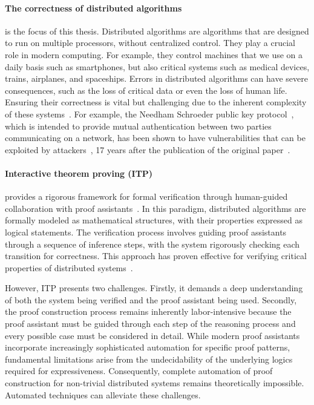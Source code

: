
\paragraph{The correctness of distributed algorithms} is the focus of this thesis. Distributed algorithms
are algorithms that are designed to run on multiple processors, without centralized control. They play a crucial role in modern computing.
For example, they control machines that we use on a daily basis such as smartphones, but also critical systems such as medical devices, trains, airplanes, and spaceships. Errors in distributed algorithms can have severe consequences, such as the loss of critical data or even the loss of human life. Ensuring their correctness is vital but challenging due to the inherent complexity of these systems~\cite{heiser2010theroad, lamport2019thebyzantine}. For example, the Needham Schroeder public key protocol~\cite{needham1978using}, which is intended to provide mutual authentication between two parties communicating on a network, has been shown to have vulnerabilities that can be exploited by attackers~\cite{lowe1996breaking}, 17 years after the publication of the original paper~\cite{cortier2014formal}.

\paragraph{Interactive theorem proving (ITP)}
provides a rigorous framework for formal verification through human-guided collaboration with proof assistants~\cite{nipkow2002isabelle,bertot2004coq,moura2021lean4}. In this paradigm, distributed algorithms are formally modeled as mathematical structures, with their properties expressed as logical statements. The verification process involves guiding proof assistants through a sequence of inference steps, with the system rigorously checking each transition for correctness. This approach has proven effective for verifying critical properties of distributed systems~\cite{potop2019formal,courtieu2016certified}.

However, ITP presents two challenges. Firstly, it demands a deep understanding of both the system being verified and the proof assistant being used. Secondly, the proof construction process remains inherently labor-intensive because the proof assistant must be guided through each step of the reasoning process and every possible case must be considered in detail.
While modern proof assistants incorporate increasingly sophisticated automation for specific proof patterns, fundamental limitations arise from the undecidability of the underlying logics required for expressiveness.
Consequently, complete automation of proof construction for non-trivial distributed systems remains theoretically impossible. Automated techniques can alleviate these challenges.


